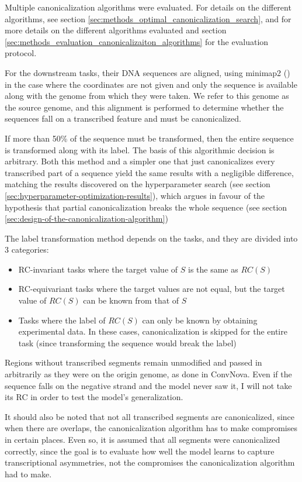 \documentclass[   ]{article}
\begin{document}
Multiple canonicalization algorithms were evaluated. For details on the different algorithms, see section \ref{sec:methods_optimal_canonicalization_search}, and for more details on the different algorithms evaluated and section \ref{sec:methods_evaluation_canonicalizaiton_algorithms} for the evaluation protocol.

For the downstream tasks, their DNA sequences are aligned, using
minimap2 (\citep{liMinimap2PairwiseAlignment2018}) in the case where the
coordinates are not given and only the sequence is available along with
the genome from which they were taken. We refer to this genome as the
source genome, and this alignment is performed to determine whether the
sequences fall on a transcribed feature and must be canonicalized.

If more than 50\% of the sequence must be transformed, then the entire sequence is transformed along with its label. The basis of this algorithmic decision is arbitrary. Both this method and a simpler one that just canonicalizes every transcribed part of a sequence yield the same results with a negligible difference, matching the results discovered on the hyperparameter search (see section \ref{sec:hyperparameter-optimization-results}), which argues in favour of the hypothesis that partial canonicalization breaks the whole sequence (see section \ref{sec:design-of-the-canonicalization-algorithm}) 

The label transformation method depends on the tasks, and they are divided into 3 categories:
\begin{itemize}
	\item RC-invariant tasks where the target value of \(S\) is the same as \(RC(S)\) 
	\item RC-equivariant tasks where the target values are not
	equal, but the target value of \(RC(S)\) can be known from that of \(S\)
	\item Tasks where the label of \(RC(S)\) can only be known by obtaining
	experimental data. In these cases, canonicalization is skipped for the
	entire task (since transforming the sequence would break the label)
\end{itemize}

Regions without transcribed segments remain unmodified and passed in arbitrarily as they were on the origin genome, as done in ConvNova. Even if the
sequence falls on the negative strand and the model never saw it, I will
not take its RC in order to test the model's generalization.

It should also be noted that not all transcribed segments are
canonicalized, since when there are overlaps, the canonicalization
algorithm has to make compromises in certain places. Even so, it is
assumed that all segments were canonicalized correctly, since the goal
is to evaluate how well the model learns to capture transcriptional
asymmetries, not the compromises the canonicalization algorithm had to
make.
\end{document}
